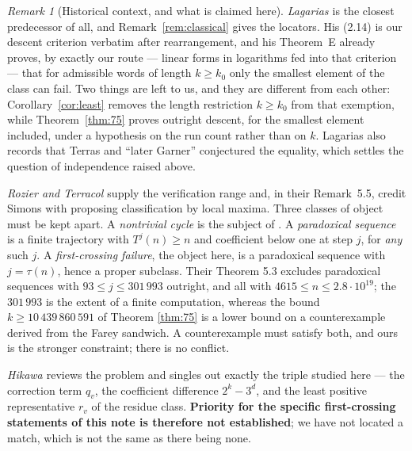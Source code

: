 \documentclass[11pt,a4paper]{article}
\theoremstyle{plain}\newtheorem{theorem}{Theorem}\newtheorem{proposition}[theorem]{Proposition}
\theoremstyle{definition}\newtheorem{example}[theorem]{Example}
\theoremstyle{remark}\newtheorem{remark}[theorem]{Remark}
\begin{document}
\begin{remark}[Historical context, and what is claimed here]
\emph{Lagarias \cite{lagarias1985}} is the closest predecessor of all, and
Remark~\ref{rem:classical} gives the locators. His (2.14) is our descent criterion verbatim
after rearrangement, and his Theorem~E already proves, by exactly our route --- linear forms in
logarithms fed into that criterion --- that for admissible words of length $k\ge k_0$ only the
smallest element of the class can fail. Two things are left to us, and they are different from
each other: Corollary~\ref{cor:least} removes the length restriction $k\ge k_0$ from that
exemption, while
Theorem~\ref{thm:75} proves outright descent, for the smallest element included, under a
hypothesis on the run count rather than on $k$. Lagarias also records \cite[\S2.3]{lagarias1985} that Terras
\cite{terras1976} and ``later Garner'' \cite{garner1981} conjectured the equality, which
settles the question of independence raised above.

\emph{Rozier and Terracol \cite{rozier2026}} supply the verification range and, in their
Remark~5.5, credit Simons with proposing classification by local maxima. Three classes of object
must be kept apart. A \emph{nontrivial cycle} is the subject of
\cite{garner1981,simonsdeweger2005,hercher2023}. A \emph{paradoxical sequence}
\cite[Def.~1.1]{rozier2026} is a finite trajectory with $T^j(n)\ge n$ and coefficient below one
at step $j$, for \emph{any} such $j$. A \emph{first-crossing failure}, the object here, is a
paradoxical sequence with $j=\tau(n)$, hence a proper subclass. Their Theorem 5.3 excludes
paradoxical sequences with $93\le j\le301\,993$ outright, and all with
$4615\le n\le2.8\cdot10^{19}$; the $301\,993$ is the extent of a finite computation, whereas
the bound $k\ge10\,439\,860\,591$ of Theorem \ref{thm:75} is a lower bound on a counterexample
derived from the Farey sandwich. A counterexample must satisfy both, and ours is the stronger
constraint; there is no conflict.

\emph{Hikawa \cite{hikawa2026}} reviews the problem and singles out exactly the triple studied
here --- the correction term $q_v$, the coefficient difference $2^k-3^d$, and the least positive
representative $r_v$ of the residue class. \textbf{Priority for the specific first-crossing
statements of this note is therefore not established}; we have not located a match, which is not
the same as there being none.
\end{remark}
\end{document}
